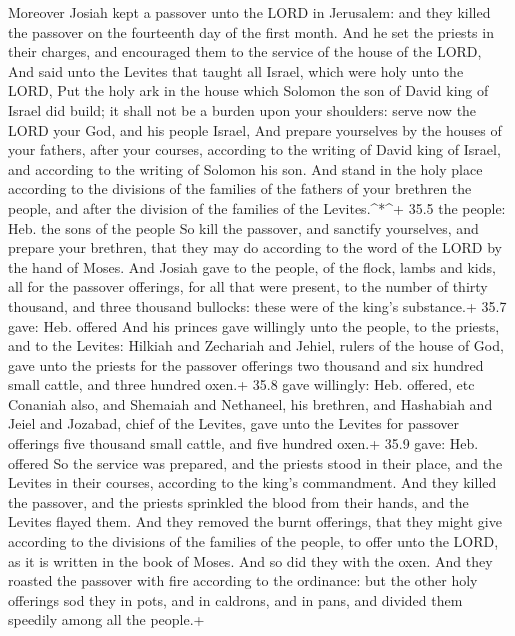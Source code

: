  Moreover Josiah kept a passover unto the LORD in Jerusalem:
and they killed the passover on the fourteenth day of the first month.
 And he set the priests in their charges, and encouraged
them to the service of the house of the LORD,  And said unto
the Levites that taught all Israel, which were holy unto the LORD, Put
the holy ark in the house which Solomon the son of David king of Israel
did build; it shall not be a burden upon your shoulders: serve now the
LORD your God, and his people Israel,  And prepare
yourselves by the houses of your fathers, after your courses, according
to the writing of David king of Israel, and according to the writing of
Solomon his son.  And stand in the holy place according to
the divisions of the families of the fathers of your brethren the
people, and after the division of the families of the Levites.\^{}*\^{}+
35.5 the people: Heb. the sons of the people  So kill the
passover, and sanctify yourselves, and prepare your brethren, that they
may do according to the word of the LORD by the hand of Moses.
 And Josiah gave to the people, of the flock, lambs and
kids, all for the passover offerings, for all that were present, to the
number of thirty thousand, and three thousand bullocks: these were of
the king's substance.+ 35.7 gave: Heb. offered  And his
princes gave willingly unto the people, to the priests, and to the
Levites: Hilkiah and Zechariah and Jehiel, rulers of the house of God,
gave unto the priests for the passover offerings two thousand and six
hundred small cattle, and three hundred oxen.+ 35.8 gave willingly: Heb.
offered, etc  Conaniah also, and Shemaiah and Nethaneel, his
brethren, and Hashabiah and Jeiel and Jozabad, chief of the Levites,
gave unto the Levites for passover offerings five thousand small cattle,
and five hundred oxen.+ 35.9 gave: Heb. offered  So the
service was prepared, and the priests stood in their place, and the
Levites in their courses, according to the king's commandment.
 And they killed the passover, and the priests sprinkled
the blood from their hands, and the Levites flayed them. 
And they removed the burnt offerings, that they might give according to
the divisions of the families of the people, to offer unto the LORD, as
it is written in the book of Moses. And so did they with the oxen.
 And they roasted the passover with fire according to the
ordinance: but the other holy offerings sod they in pots, and in
caldrons, and in pans, and divided them speedily among all the people.+
